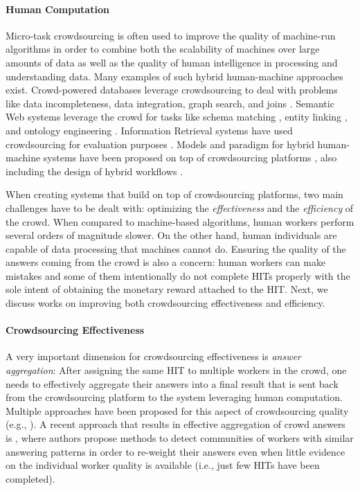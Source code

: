 \paragraph{Human Computation}
Micro-task crowdsourcing is often used to improve the quality of machine-run algorithms in order to combine both the scalability of machines over large amounts of data as well as the quality of human intelligence in processing and understanding data.
Many examples of such hybrid human-machine approaches exist.
% 
Crowd-powered databases \cite{crowddb} leverage crowdsourcing to deal with problems like  data incompleteness,  data integration, graph search, and joins \cite{crowder,graphsearch,crowdjoins}.
% 
Semantic Web systems leverage the crowd for tasks like schema matching \cite{crowdmap}, entity linking \cite{zencrowd}, and ontology engineering \cite{bioonto}.
% 
Information Retrieval systems have used crowdsourcing for evaluation purposes \cite{mizzaroalonso}.
% 
Models and paradigm for hybrid human-machine systems have been proposed on top of crowdsourcing platforms \cite{crowdcomputer}, also including the design of hybrid workflows \cite{workflows}.

When creating systems that build on top of crowdsourcing platforms, two main challenges have to be dealt with: optimizing the \emph{effectiveness} and the \emph{efficiency}  of the crowd. When compared to machine-based algorithms, human workers perform several orders of magnitude slower. On the other hand, human individuals are capable of data processing that machines cannot do. Ensuring the quality of the answers coming from the crowd is also a concern: human workers can make mistakes and some of them intentionally do not complete HITs properly with the sole intent of obtaining the monetary reward attached to the HIT. Next, we discuss works on improving both crowdsourcing effectiveness and efficiency.





\paragraph{Crowdsourcing Effectiveness}
A very important dimension for crowdsourcing effectiveness is \emph{answer aggregation}: After assigning the same HIT to multiple workers in the crowd, one needs to effectively aggregate their answers into a final result that is sent back from the crowdsourcing platform to the system leveraging human computation. Multiple approaches have been proposed for this aspect of crowdsourcing quality (e.g.,
\cite{Venanzi:2014:CBA:2566486.2567989,square,zencrowd,Hosseini:2012:ALM:2260641.2260661}).
% 
A recent approach that results in effective aggregation of crowd answers is \cite{Venanzi:2014:CBA:2566486.2567989}, where authors propose methods to detect communities of workers with similar answering patterns in order to re-weight their answers even when little evidence on the individual worker quality is available (i.e., just few HITs have been completed).

